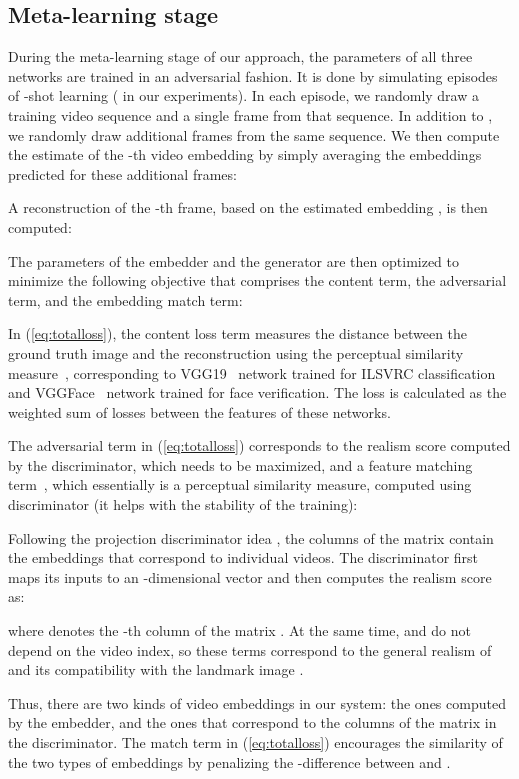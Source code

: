 \documentclass[10pt,twocolumn,letterpaper]{article}
\newcommand{\eq}[1]{(\ref{eq:#1})}
\begin{document}
\subsection{Meta-learning stage}

During the meta-learning stage of our approach, the parameters of all three networks are trained in an adversarial fashion. It is done by simulating episodes of -shot learning ( in our experiments). In each episode, we randomly draw a training video sequence  and a single frame  from that sequence. In addition to , we randomly draw additional  frames  from the same sequence. We then compute the estimate  of the -th video embedding by simply averaging the embeddings  predicted for these additional frames:


A reconstruction  of the -th frame, based on the estimated embedding , is then computed:


The parameters of the embedder and the generator are then optimized to minimize the following objective that comprises the content term, the adversarial term, and the embedding match term:


In \eq{totalloss}, the content loss term  measures the distance between the ground truth image  and the reconstruction  using the perceptual similarity measure~\cite{Johnson16}, corresponding to VGG19~\cite{Simonyan15} network trained for ILSVRC classification and VGGFace~\cite{Parkhi15} network trained for face verification. The loss is calculated as the weighted sum of  losses between the features of these networks.

The adversarial term in \eq{totalloss} corresponds to the realism score computed by the discriminator, which needs to be maximized, and a feature matching term~\cite{Wang18b}, which essentially is a perceptual similarity measure, computed using discriminator (it helps with the stability of the training):

Following the projection discriminator idea \cite{Miyato18a}, the columns of the matrix  contain the embeddings that correspond to individual videos. The discriminator first maps its inputs to an -dimensional vector  and then computes the realism score as: 

where  denotes the -th column of the matrix . At the same time,  and  do not depend on the video index, so these terms correspond to the general realism of  and its compatibility with the landmark image .

Thus, there are two kinds of video embeddings in our system: the ones computed by the embedder, and the ones that correspond to the columns of the matrix  in the discriminator. The match term  in \eq{totalloss} encourages the similarity of the two types of embeddings by penalizing the -difference between  and .
\end{document}
